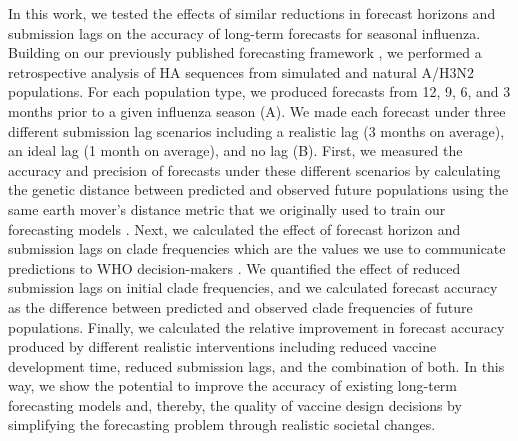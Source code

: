 \documentclass[9pt,lineno]{elife}
\begin{document}
In this work, we tested the effects of similar reductions in forecast horizons and submission lags on the accuracy of long-term forecasts for seasonal influenza.
Building on our previously published forecasting framework \citep{Huddleston2020}, we performed a retrospective analysis of HA sequences from simulated and natural A/H3N2 populations.
For each population type, we produced forecasts from 12, 9, 6, and 3 months prior to a given influenza season (A).
We made each forecast under three different submission lag scenarios including a realistic lag (3 months on average), an ideal lag (1 month on average), and no lag (B).
First, we measured the accuracy and precision of forecasts under these different scenarios by calculating the genetic distance between predicted and observed future populations using the same earth mover's distance metric that we originally used to train our forecasting models \citep{Rubner1998}.
Next, we calculated the effect of forecast horizon and submission lags on clade frequencies which are the values we use to communicate predictions to WHO decision-makers \citep{Huddleston2024}.
We quantified the effect of reduced submission lags on initial clade frequencies, and we calculated forecast accuracy as the difference between predicted and observed clade frequencies of future populations.
Finally, we calculated the relative improvement in forecast accuracy produced by different realistic interventions including reduced vaccine development time, reduced submission lags, and the combination of both.
In this way, we show the potential to improve the accuracy of existing long-term forecasting models and, thereby, the quality of vaccine design decisions by simplifying the forecasting problem through realistic societal changes.

\end{document}
